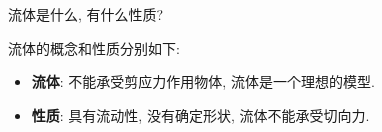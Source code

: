 \begin{problem}[03]
流体是什么, 有什么性质?
\end{problem}
\begin{solution}
流体的概念和性质分别如下:
\begin{itemize}
\item \textbf{流体}: 不能承受剪应力作用物体, 流体是一个理想的模型.
\item \textbf{性质}: 具有流动性, 没有确定形状, 流体不能承受切向力.
\end{itemize}
\end{solution}
